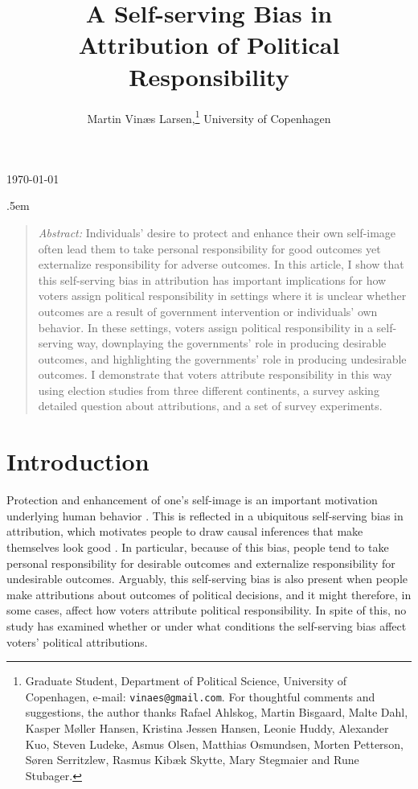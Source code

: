 \documentclass[a4paper,11pt]{article}
\title{\bigskip \bigskip \sffamily \Huge  A Self-serving Bias in \\  Attribution of Political Responsibility}
\author{Martin Vinæs Larsen,\footnote{Graduate Student, Department of Political Science, University of Copenhagen, e-mail: \texttt{vinaes@gmail.com}. For thoughtful comments and suggestions, the author thanks Rafael Ahlskog, Martin Bisgaard, Malte Dahl, Kasper Møller Hansen, Kristina Jessen Hansen, Leonie Huddy, Alexander Kuo, Steven Ludeke,  Asmus Olsen, Matthias Osmundsen, Morten Petterson, Søren Serritzlew, Rasmus Kibæk Skytte, Mary Stegmaier and Rune Stubager.} \vspace{-0.3in} \newline  University of Copenhagen} %
\makeatletter
\renewcommand{\maketitle}{
	\begin{flushleft}
		
		\onehalfspacing
		
		\@title
		
		\lineskip .5em
		\normalfont{\normalsize{\@author}}
\end{flushleft}}
\makeatother
\begin{document}
	
	
	
	
	
	
	\begin{footnotesize} \noindent \today \end{footnotesize} %
	
	\vspace{0.7in}
	
	\maketitle
	
	\bigskip
	
	\begin{quotation} %
		\singlespace
		\small \noindent \emph{Abstract:} Individuals' desire to protect and enhance their own self-image often lead them to take personal responsibility for good outcomes yet externalize responsibility for adverse outcomes. In this article, I show that this self-serving bias in attribution has important implications for how voters assign political responsibility in settings where it is unclear whether outcomes are a result of government intervention or individuals' own behavior. In these settings, voters assign political responsibility in a self-serving way, downplaying the governments' role in producing desirable outcomes, and highlighting the governments' role in producing undesirable outcomes. I demonstrate that voters attribute responsibility in this way using election studies from three different continents, a survey asking detailed question about attributions, and a set of survey experiments.
		
	\end{quotation}
	
	
	\thispagestyle{empty} %
	
	
	\section{Introduction} %
	\noindent Protection and enhancement of one's self-image is  an important motivation underlying human behavior \citep{sedikides1995multiply,beauregard1998turning,baumeister1999self}. This is reflected in a ubiquitous self-serving bias in attribution, which motivates people to draw causal inferences that make themselves look good \citep{kunda1999social,heider2013psychology,stephan1976egotism}. In particular, because of this bias, people tend to take personal responsibility for desirable outcomes and externalize responsibility for undesirable outcomes. Arguably, this self-serving bias is also present when people make attributions about outcomes of political decisions, and it might therefore, in some cases, affect how voters attribute political responsibility. In spite of this, no study has examined whether or under what conditions the self-serving bias affect voters' political attributions.
	
\end{document}
